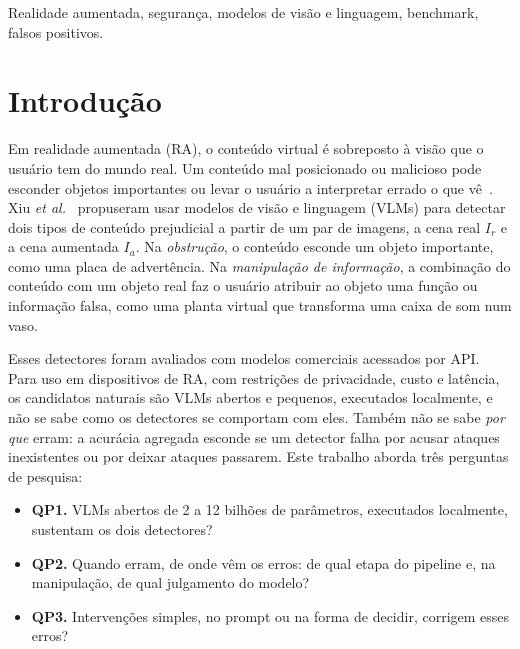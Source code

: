 \documentclass[conference]{IEEEtran}
\newcommand{\Ir}{I_r}
\newcommand{\Ia}{I_a}
\begin{document}
\begin{IEEEkeywords}
Realidade aumentada, segurança, modelos de visão e linguagem, benchmark, falsos positivos.
\end{IEEEkeywords}

\section{Introdução}

Em realidade aumentada (RA), o conteúdo virtual é sobreposto à visão que o usuário tem do mundo real.
Um conteúdo mal posicionado ou malicioso pode esconder objetos importantes ou levar o usuário a
interpretar errado o que vê~\cite{roesner2014,arya}. Xiu \emph{et al.}~\cite{viddar} propuseram usar
modelos de visão e linguagem (VLMs) para detectar dois tipos de conteúdo prejudicial a partir de um par
de imagens, a cena real $\Ir$ e a cena aumentada $\Ia$. Na \emph{obstrução}, o conteúdo esconde um objeto
importante, como uma placa de advertência. Na \emph{manipulação de informação}, a combinação do conteúdo
com um objeto real faz o usuário atribuir ao objeto uma função ou informação falsa, como uma planta
virtual que transforma uma caixa de som num vaso.

Esses detectores foram avaliados com modelos comerciais acessados por API. Para uso em dispositivos de
RA, com restrições de privacidade, custo e latência, os candidatos naturais são VLMs abertos e
pequenos, executados localmente, e não se sabe como os detectores se comportam com eles. Também não se
sabe \emph{por que} erram: a acurácia agregada esconde se um detector falha por acusar ataques
inexistentes ou por deixar ataques passarem. Este trabalho aborda três perguntas de pesquisa:
\begin{itemize}
\item \textbf{QP1.} VLMs abertos de 2 a 12 bilhões de parâmetros, executados localmente, sustentam os dois
  detectores?
\item \textbf{QP2.} Quando erram, de onde vêm os erros: de qual etapa do pipeline e, na manipulação, de
  qual julgamento do modelo?
\item \textbf{QP3.} Intervenções simples, no prompt ou na forma de decidir, corrigem esses erros?
\end{itemize}
\end{document}
